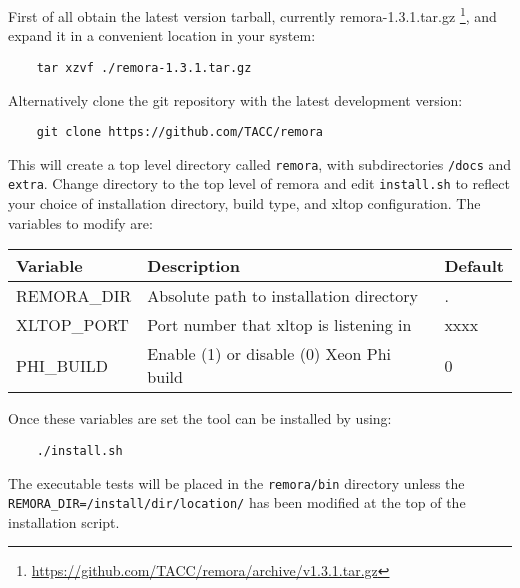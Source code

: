 \documentclass[10pt,a4paper]{report}
\begin{document}
First of all obtain the latest version tarball, currently remora-1.3.1.tar.gz \footnote{\href{https://github.com/TACC/remora/archive/v1.3.1.tar.gz}{https://github.com/TACC/remora/archive/v1.3.1.tar.gz}}, and expand it in a convenient location in your system:

\begin{verbatim}
    tar xzvf ./remora-1.3.1.tar.gz
\end{verbatim}

Alternatively clone the git repository with the latest development version:

\begin{verbatim}
    git clone https://github.com/TACC/remora
\end{verbatim}

This will create a top level directory called \verb+remora+, with subdirectories \verb+/docs+ and \verb+extra+. Change directory to the top level of remora and edit \verb+install.sh+ to reflect your choice of installation directory, build type, and xltop configuration. The variables to modify are:

\begin{table}[h]
\centering
\label{tab:env}
\begin{tabular}{|l|l|l|}
\hline
\bf{Variable}	& \bf{Description}                          & \bf{Default}\\\hline
REMORA\_DIR     & Absolute path to installation directory   & . \\\hline
XLTOP\_PORT     & Port number that xltop is listening in    & xxxx \\\hline
PHI\_BUILD      & Enable (1) or disable (0) Xeon Phi build  & 0 \\\hline
\end{tabular}
\end{table}

Once these variables are set the tool can be installed by using:

\begin{verbatim}
    ./install.sh
\end{verbatim}

The executable tests will be placed in the \verb+remora/bin+ directory unless the \verb+REMORA_DIR=/install/dir/location/+ has been modified at the top of the installation script. 

\FloatBarrier
\end{document}
